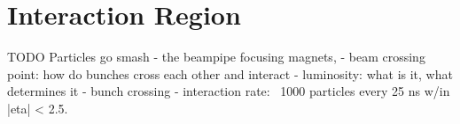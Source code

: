 \section{Interaction Region} TODO
    Particles go smash
    - the beampipe focusing magnets,
    - beam crossing point: how do bunches cross each other and interact
    - luminosity: what is it, what determines it 
    - bunch crossing
    - interaction rate: ~1000 particles every 25 ns w/in |eta| < 2.5.

